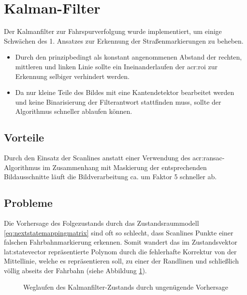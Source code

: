 \section{Kalman-Filter \dcsecondauthorshort}

Der Kalmanfilter zur Fahrspurverfolgung wurde implementiert, um einige Schwächen des 1. Ansatzes zur Erkennung der Straßenmarkierungen zu beheben.
\begin{itemize}
\item Durch den prinzipbedingt als konstant angenommenen Abstand der rechten, mittleren und linken Linie sollte ein \glqq Ineinanderlaufen \grqq der \gls{acr:roi} zur Erkennung selbiger verhindert werden.
\item Da nur kleine Teile des Bildes mit eine Kantendetektor bearbeitet werden und keine Binarisierung der Filterantwort stattfinden muss, sollte der Algorithmus schneller ablaufen können.
\end{itemize}

\subsection{Vorteile}
Durch den Einsatz der Scanlines anstatt einer Verwendung des \gls{acr:ransac}-Algorithmus im Zusammenhang mit Maskierung der entsprechenden Bildausschnitte läuft die Bildverarbeitung ca. um Faktor 5 schneller ab.

\subsection{Probleme}
Die Vorhersage des Folgezustands durch das Zustandsraummodell \eqref{eq:nextstatemappingmatrix} sind oft so schlecht, dass Scanlines Punkte einer falschen Fahrbahnmarkierung erkennen. Somit \glqq wandert \grqq das im Zustandsvektor \gls{lat:statevector} repräsentierte Polynom durch die fehlerhafte Korrektur von der Mittellinie, welche es repräsentieren soll, zu einer der Randlinen und schließlich völlig abseits der Fahrbahn (siehe Abbildung \ref{fig:evaluation:kalman:weggezogen}).

\begin{figure}[ht] %
	\centering
	\qquad
	\qquad
	\caption{\glqq Weglaufen \grqq des Kalmanfilter-Zustands durch ungenügende Vorhersage}
	\label{fig:evaluation:kalman:weggezogen}
\end{figure}

